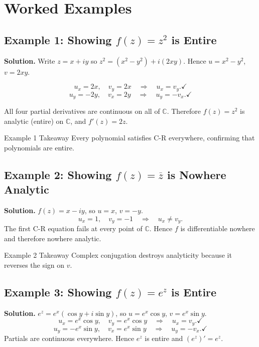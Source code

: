 \documentclass[12pt,a4paper]{article}
\begin{document}
\section{Worked Examples}

\subsection*{Example 1: Showing $f(z) = z^{2}$ is Entire}

\textbf{Solution.}  Write $z = x + iy$ so $z^{2} = (x^{2}-y^{2}) + i(2xy)$.
Hence $u = x^{2}-y^{2}$, $v = 2xy$.

\[
  u_x = 2x, \quad v_y = 2x \quad \Rightarrow \quad u_x = v_y.\checkmark
\]
\[
  u_y = -2y, \quad v_x = 2y \quad \Rightarrow \quad u_y = -v_x.\checkmark
\]

All four partial derivatives are continuous on all of $\mathbb{C}$.
Therefore $f(z) = z^{2}$ is analytic (entire) on $\mathbb{C}$, and $f'(z) = 2z$.

\begin{learnbox}{Example 1 Takeaway}
Every polynomial satisfies C-R everywhere, confirming that polynomials are entire.
\end{learnbox}

\subsection*{Example 2: Showing $f(z) = \overline{z}$ is Nowhere Analytic}

\textbf{Solution.}  $f(z) = x - iy$, so $u = x$, $v = -y$.
\[
  u_x = 1, \quad v_y = -1 \quad \Rightarrow \quad u_x \neq v_y.
\]
The first C-R equation fails at every point of $\mathbb{C}$.
Hence $f$ is differentiable nowhere and therefore nowhere analytic.

\begin{learnbox}{Example 2 Takeaway}
Complex conjugation destroys analyticity because it reverses the sign on $v$.
\end{learnbox}

\subsection*{Example 3: Showing $f(z) = e^{z}$ is Entire}

\textbf{Solution.}  $e^{z} = e^{x}(\cos y + i\sin y)$, so $u = e^{x}\cos y$, $v = e^{x}\sin y$.
\[
  u_x = e^{x}\cos y, \quad v_y = e^{x}\cos y \quad \Rightarrow \quad u_x = v_y.\checkmark
\]
\[
  u_y = -e^{x}\sin y, \quad v_x = e^{x}\sin y \quad \Rightarrow \quad u_y = -v_x.\checkmark
\]
Partials are continuous everywhere. Hence $e^{z}$ is entire and $(e^{z})' = e^{z}$.
\end{document}
